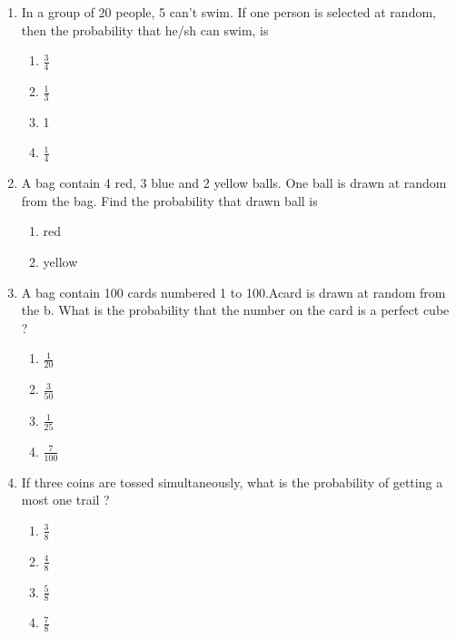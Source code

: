 \begin{enumerate}
\begin{enumerate}
                        \end{enumerate}
        \item In a group of 20 people, 5 can't swim. If one person is selected at random, then the probability that he/sh can swim, is
                        \begin{enumerate}
                                \item $ \frac {3} {4} $
                                \item $ \frac {1} {3} $
                                \item 1
                                \item $ \frac {1} {4} $
                        \end{enumerate}
        \item A bag contain 4 red, 3 blue and 2 yellow balls. One ball is drawn at random from the bag. Find the probability that drawn ball is
                \begin{enumerate}
                                        \item red
                                        \item yellow
                \end{enumerate}
        \item A bag contain 100 cards numbered 1 to 100.Acard is drawn at random from the b. What is the probability that the number on the card is a perfect cube ?
                        \begin{enumerate}
                                \item $ \frac {1} {20} $
                                \item $ \frac {3} {50} $
                                \item $ \frac {1} {25} $
                                \item $ \frac {7} {100} $
                        \end{enumerate}
        \item If three coins are tossed simultaneously, what is the probability of getting a most one trail ?
                        \begin{enumerate}
                                \item $ \frac {3} {8} $
                                \item $ \frac {4} {8} $
                                \item $ \frac {5} {8} $
                                \item $ \frac {7} {8} $

\end{enumerate}
\end{enumerate}
